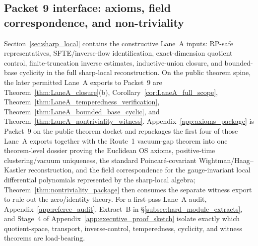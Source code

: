 \subsection*{Packet 9 interface: axioms, field correspondence, and non-triviality}
Section~\ref{sec:sharp_local} contains the constructive Lane~A inputs: RP-safe representatives, SFTE/inverse-flow identification, exact-dimension quotient control, finite-truncation inverse estimates, inductive-union closure, and bounded-base cyclicity in the full sharp-local reconstruction.
On the public theorem spine, the later permitted Lane~A exports to Packet~9 are Theorem~\ref{thm:LaneA_closure}(b), Corollary~\ref{cor:LaneA_full_scope}, Theorem~\ref{thm:LaneA_temperedness_verification}, Theorem~\ref{thm:LaneA_bounded_base_cyclic}, and Theorem~\ref{thm:LaneA_nontriviality_witness}.
Appendix~\ref{app:axioms_package} is Packet~9 on the public theorem docket and repackages the first four of those Lane~A exports together with the Route~1 vacuum-gap theorem into one theorem-level dossier proving the Euclidean OS axioms, positive-time clustering/vacuum uniqueness, the standard Poincar\'e-covariant Wightman/Haag--Kastler reconstruction, and the field correspondence for the gauge-invariant local differential polynomials represented by the sharp-local algebra; Theorem~\ref{thm:nontriviality_package} then consumes the separate witness export to rule out the zero/identity theory.
For a first-pass Lane~A audit, Appendix~\ref{app:referee_audit}, Extract~B in \S\ref{subsec:hard_module_extracts}, and Stage~4 of Appendix~\ref{app:executive_proof_sketch} isolate exactly which quotient-space, transport, inverse-control, temperedness, cyclicity, and witness theorems are load-bearing.
